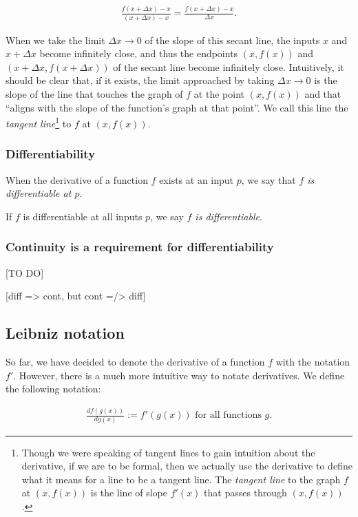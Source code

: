 \begin{align*}
    \frac{f(x + \Delta x) - x}{(x + \Delta x) - x} = \frac{f(x + \Delta x) - x}{\Delta x}.
\end{align*}

When we take the limit $\Delta x \rightarrow 0$ of the slope of this secant line, the inputs $x$ and $x + \Delta x$ become infinitely close, and thus the endpoints $(x, f(x))$ and $(x + \Delta x, f(x + \Delta x))$ of the secant line become infinitely close. Intuitively, it should be clear that, if it exists, the limit approached by taking $\Delta x \rightarrow 0$ is the slope of the line that touches the graph of $f$ at the point $(x, f(x))$ and that ``aligns with the slope of the function's graph at that point''. We call this line the \textit{tangent line}\footnote{Though we were speaking of tangent lines to gain intuition about the derivative, if we are to be formal, then we actually use the derivative to define what it means for a line to be a tangent line. The \textit{tangent line} to the graph $f$ at $(x, f(x))$ is the line of slope $f'(x)$ that passes through $(x, f(x))$.} to $f$ at $(x, f(x))$.

\subsubsection*{Differentiability}

When the derivative of a function $f$ exists at an input $p$, we say that \textit{$f$ is differentiable at $p$}.

If $f$ is differentiable at all inputs $p$, we say \textit{$f$ is differentiable}.

\subsubsection*{Continuity is a requirement for differentiability}

[TO DO]

[diff => cont, but cont =/> diff]

\subsection*{Leibniz notation}
     
So far, we have decided to denote the derivative of a function $f$ with the notation $f'$. However, there is a much more intuitive way to notate derivatives. We define the following notation:

\begin{align*}
    \frac{df(g(x))}{dg(x)} := f'(g(x)) \text{ for all functions $g$}. 
\end{align*}


